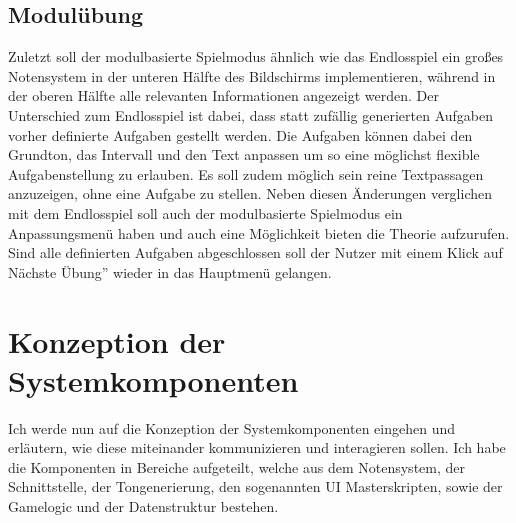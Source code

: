 \subsection{Modulübung}
Zuletzt soll der modulbasierte Spielmodus ähnlich wie das Endlosspiel ein großes Notensystem in der unteren Hälfte des Bildschirms implementieren, während in der oberen Hälfte alle relevanten Informationen angezeigt werden. Der Unterschied zum Endlosspiel ist dabei, dass statt zufällig generierten Aufgaben vorher definierte Aufgaben gestellt werden. Die Aufgaben können dabei den Grundton, das Intervall und den Text anpassen um so eine möglichst flexible Aufgabenstellung zu erlauben. Es soll zudem möglich sein reine Textpassagen anzuzeigen, ohne eine Aufgabe zu stellen. Neben diesen Änderungen verglichen mit dem Endlosspiel soll auch der modulbasierte Spielmodus ein Anpassungsmenü haben und auch eine Möglichkeit bieten die Theorie aufzurufen. Sind alle definierten Aufgaben abgeschlossen soll der Nutzer mit einem Klick auf \glqq Nächste Übung'' wieder in das Hauptmenü gelangen. 

\section{Konzeption der Systemkomponenten}


%

Ich werde nun auf die Konzeption der Systemkomponenten eingehen und erläutern, wie diese miteinander kommunizieren und interagieren sollen. Ich habe die Komponenten in Bereiche aufgeteilt, welche aus dem Notensystem, der Schnittstelle, der Tongenerierung, den sogenannten UI Masterskripten, sowie der Gamelogic und der Datenstruktur bestehen.\\

